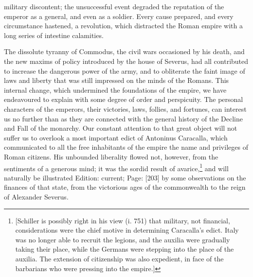 military discontent; the unsuccessful event degraded the reputation of the emperor as a general, and even as a soldier. Every cause prepared, and every circumstance hastened, a revolution, which distracted the Roman empire with a long series of intestine calamities.

The dissolute tyranny of Commodus, the civil wars occasioned by his death, and the new maxims of policy introduced by the house of Severus, had all contributed to increase the dangerous power of the army, and to obliterate the faint image of laws and liberty that was still impressed on the minds of the Romans. This internal change, which undermined the foundations of the empire, we have endeavoured to explain with some degree of order and perspicuity. The personal characters of the emperors, their victories, laws, follies, and fortunes, can interest us no further than as they are connected with the general history of the Decline and Fall of the monarchy. Our constant attention to that great object will not suffer us to overlook a most important edict of Antoninus Caracalla, which communicated to all the free inhabitants of the empire the name and privileges of Roman citizens. His unbounded liberality flowed not, however, from the sentiments of a generous mind; it was the sordid result of avarice,\footnote{[Schiller is possibly right in his view (i. 751) that military, not financial, considerations were the chief motive in determining Caracalla\texthebrew{}’s edict. Italy was no longer able to recruit the legions, and the auxilia were gradually taking their place, while the Germans were stepping into the place of the auxilia. The extension of citizenship was also expedient, in face of the barbarians who were pressing into the empire.]} and will naturally be illustrated Edition: current; Page: [203] by some observations on the finances of that state, from the victorious ages of the commonwealth to the reign of Alexander Severus.

